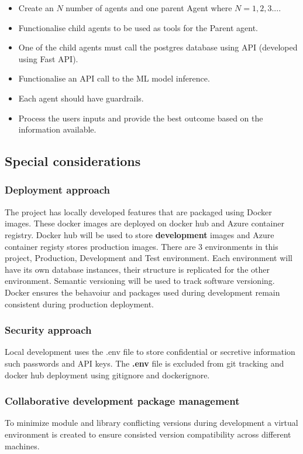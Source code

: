 \documentclass{article}
\begin{document}
\begin{itemize}
    \item Create an $N$ number of agents and one parent Agent where $N = 1,2,3...$.
    \item Functionalise child agents to be used as tools for the Parent agent.
    \item One of the child agents must call the postgres database using API (developed using Fast API).
    \item Functionalise an API call to the ML model inference. 
    \item Each agent should have guardrails.
    \item Process the users inputs and provide the best outcome based on the information available.
\end{itemize}

 \subsection{Special considerations}
 \subsubsection{Deployment approach}
 The project has locally developed features that are packaged using Docker images. These docker images are deployed on docker hub and Azure container registry. Docker hub will be used
 to store \textbf{development} images and Azure container registy stores production images. There are 3 environments in this project, Production, Development and Test environment. Each environment
 will have its own database instances, their structure is replicated for the other environment. Semantic versioning will be used to track software versioning. Docker ensures the behavoiur and packages
 used during development remain consistent during production deployment.
\subsubsection{Security approach}
Local development uses the .env file to store confidential or secretive information such passwords and API keys. The \textbf{.env} file is excluded from git tracking and docker hub deployment
using gitignore and dockerignore.
\subsubsection{Collaborative development package management}
To minimize module and library conflicting versions during development a virtual environment is created to ensure consisted version compatibility across different machines. 
\end{document}
